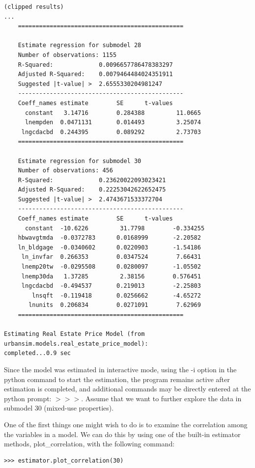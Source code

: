 \begin{verbatim}
(clipped results)
...
    ===============================================

    Estimate regression for submodel 28
    Number of observations: 1155
    R-Squared:             0.0096657786478383297
    Adjusted R-Squared:    0.0079464484024351911
    Suggested |t-value| >  2.6555330204981247
    -----------------------------------------------
    Coeff_names estimate        SE      t-values
      constant   3.14716        0.284388         11.0665
      lnempden  0.0471131       0.014493         3.25074
     lngcdacbd  0.244395        0.089292         2.73703
    ===============================================

    Estimate regression for submodel 30
    Number of observations: 456
    R-Squared:             0.23620022093023421
    Adjusted R-Squared:    0.22253042622652475
    Suggested |t-value| >  2.4743671533372704
    -----------------------------------------------
    Coeff_names estimate        SE      t-values
      constant  -10.6226         31.7798        -0.334255
    hbwavgtmda  -0.0372783      0.0168999       -2.20582
    ln_bldgage  -0.0340602      0.0220903       -1.54186
     ln_invfar  0.266353        0.0347524        7.66431
     lnemp20tw  -0.0295508      0.0280097       -1.05502
     lnemp30da   1.37285         2.38156        0.576451
     lngcdacbd  -0.494537       0.219013        -2.25803
        lnsqft  -0.119418       0.0256662       -4.65272
       lnunits  0.206834        0.0271091        7.62969
    ===============================================

Estimating Real Estate Price Model (from urbansim.models.real_estate_price_model): 
completed...0.9 sec
\end{verbatim}

Since the model was estimated in interactive mode, using the
-i option in the python command to start the estimation, the
program remains active after estimation is completed, and
additional commands may be directly entered at the python
prompt: $>>>$.  Assume that we want to further explore the
data in submodel 30 (mixed-use properties).

One of the first things one might wish to do is to examine
the correlation among the variables in a model.  We can do
this by using one of the built-in estimator methods,
plot\_correlation, with the following command:

\begin{verbatim}
>>> estimator.plot_correlation(30)
\end{verbatim}

